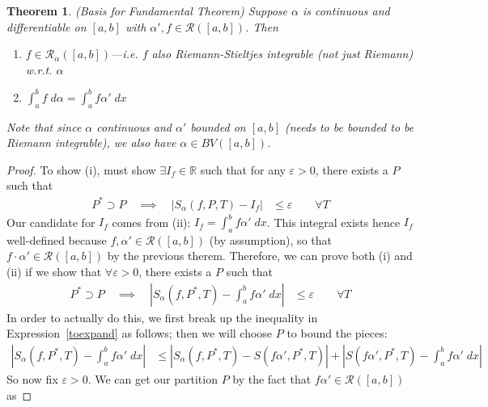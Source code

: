 \documentclass[12pt]{article}
\numberwithin{equation}{section} %
\theoremstyle{plain}
\newtheorem{thm}{Theorem}[section]
\theoremstyle{definition}
\theoremstyle{remark}
\newcommand{\sR}{\mathscr{R}}
\newcommand{\R}{\mathbb{R}}
\begin{document}
\begin{thm}\emph{(Basis for Fundamental Theorem)}
\label{ftcbasis}
Suppose $\alpha$ is continuous and differentiable on $[a,b]$ with
$\alpha', f\in\mathscr{R}([a,b])$. Then
\begin{enumerate}[label=\emph{(\roman*)}]
  \item $f\in\mathscr{R}_\alpha([a,b])$---i.e. $f$ also
    Riemann-\emph{Stieltjes} integrable (not just Riemann) w.r.t.
    $\alpha$
  \item $\int^b_a f\;d\alpha = \int^b_a f \alpha'\;dx$
\end{enumerate}
Note that since $\alpha$ continuous and $\alpha'$ bounded on $[a,b]$
(needs to be bounded to be Riemann integrable), we also have
$\alpha \in BV([a,b])$.
\end{thm}
\begin{proof}
To show (i), must show $\exists I_f\in\R$ such that for any
$\varepsilon>0$, there exists a $P$ such that
\begin{align*}
  P^*\supset P
  \quad\implies\quad
  \left\lvert  S_\alpha(f,P,T) - I_f \right\rvert &\leq \varepsilon
  \qquad \forall T
\end{align*}
Our candidate for $I_f$ comes from (ii): $I_f=\int^b_a f\alpha'\; dx$.
This integral exists hence $I_f$ well-defined because $f,\alpha'
\in\mathscr{R}([a,b])$ (by assumption), so that $f\cdot
\alpha'\in\sR([a,b])$ by the previous therem.
Therefore, we can prove both (i) and (ii) if we show that
$\forall\varepsilon>0$, there exists a $P$ such that
\begin{align}
  P^*\supset P
  \quad\implies\quad
  \left\lvert
  S_\alpha(f,P^*,T) - \int^b_a f\alpha'\;dx
  \right\rvert &\leq \varepsilon
  \qquad \forall T
  \label{toexpand}
\end{align}
In order to actually do this, we first break up the inequality in
Expression~\ref{toexpand} as follows; then we will choose $P$ to bound
the pieces:
\begin{align}
  \left\lvert
  S_\alpha(f,P^*,T) - \int^b_a f\alpha'\;dx
  \right\rvert
  &\leq
  \left\lvert
  S_\alpha(f,P^*,T) - S(f\alpha',P^*,T)
  \right\rvert
  +
  \left\lvert
  S(f\alpha',P^*,T)
  - \int^b_a f\alpha'\;dx
  \right\rvert
  \label{fundbasistobound}
\end{align}
So now fix $\varepsilon>0$.
We can get our partition $P$ by the fact that $f\alpha'\in\sR([a,b])$ as

\end{proof}
\end{document}
